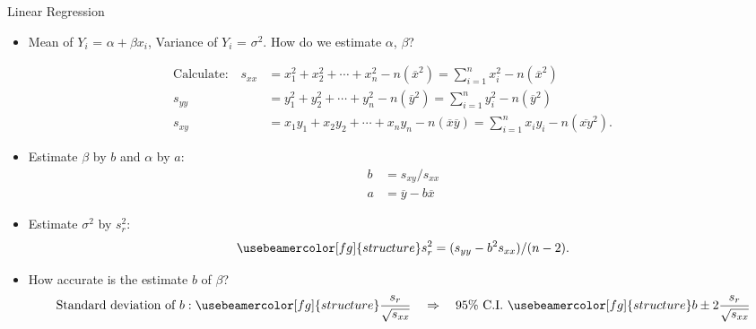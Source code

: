 \documentclass[10pt, handout, xcolor=table]{beamer}
\newcommand*\themecol{\usebeamercolor[fg]{structure}}
\begin{document}
\begin{frame}{Linear Regression}
\small
\begin{itemize}
\setlength{\itemsep}{6pt}
\item Mean of $Y_i$ = $\alpha + \beta x_i$, Variance of $Y_i$ = $\sigma^2$. How do we estimate $\alpha$, $\beta$?
\end{itemize}
\begin{align*}
\text{Calculate:} \quad s_{xx} &= x_1^2 + x_2^2 + \cdots + x_n^2 - n(\overline{x}^2) = \sum_{i=1}^n x_i^2 - n(\overline{x}^2)\\
s_{yy} &= y_1^2 + y_2^2 + \cdots + y_n^2 - n(\overline{y}^2) = \sum_{i=1}^n y_i^2 - n(\overline{y}^2) \\
s_{xy} &= x_1y_1 + x_2y_2 + \cdots + x_ny_n - n(\overline{x}\overline{y}) = \sum_{i=1}^n x_i y_i - n(\overline{xy}^2).
\end{align*}
\vspace{-0.25cm}
\begin{itemize}
\setlength{\itemsep}{8pt}
\item Estimate $\beta$ by $b$ and $\alpha$ by $a$:
{\themecol \begin{align*}
 b &= s_{xy}/s_{xx}\\
a &= \overline{y} - b\overline{x}
\end{align*}}
\vspace{-0.5cm}
\item Estimate $\sigma^2$ by $s_r^2$:
$${\themecol s_r^2 = (s_{yy} - b^2 s_{xx})/(n-2).}$$
\item How accurate is the estimate $b$ of $\beta$?
$$\text{Standard deviation of }b:{ \themecol \frac{s_r}{\sqrt{s_{xx}}}} \quad \Rightarrow \quad 95\% \text{ C.I. }{\themecol b \pm 2\frac{s_r}{\sqrt{s_{xx}}}}$$
\end{itemize}
\end{frame}
\end{document}
